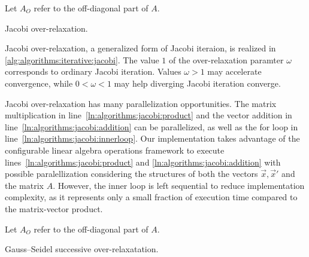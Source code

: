 \begin{algorithm}
  \;
  Let $A_O$ refer to the off-diagonal part of $A$.\;
  \;
  \caption{Jacobi over-relaxation.}
  \label{alg:algorithms:iterative:jacobi}
\end{algorithm}

Jacobi over-relaxation, a generalized form of Jacobi iteraion, is
realized in \cref{alg:algorithms:iterative:jacobi}. The value $1$ of
the over-relaxation paramter $\omega$ corresponds to ordinary Jacobi
iteration. Values $\omega > 1$ may accelerate convergence, while
$0 < \omega < 1$ may help diverging Jacobi iteration converge.

Jacobi over-relaxation has many parallelization opportunities. The
matrix multiplication in line~\ref{ln:algorithms:jacobi:product} and
the vector addition in line~\ref{ln:algorithms:jacobi:addition} can be
parallelized, as well as the for loop in
line~\ref{ln:algorithms:jacobi:innerloop}. Our implementation takes
advantage of the configurable linear algebra operations framework to
execute lines~\ref{ln:algorithms:jacobi:product} and
\ref{ln:algorithms:jacobi:addition} with possible paralellization
considering the structures of both the vectors $\vec{x}, \vec{x}'$ and
the matrix $A$. However, the inner loop is left sequential to reduce
implementation complexity, as it represents only a small fraction of
execution time compared to the matrix-vector product.

\begin{algorithm}
  \;
  Let $A_O$ refer to the off-diagonal part of $A$.\;
  \;
  \caption{Gauss--Seidel successive over-relaxatation.}
  \label{alg:algorithms:iterative:gs}
\end{algorithm}


